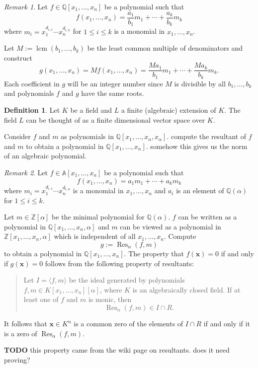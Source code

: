 \documentclass[
]{book}
\theoremstyle{definition}
\newtheorem{definition}{Definition}[chapter]
\theoremstyle{definition}
\theoremstyle{definition}
\theoremstyle{definition}
\theoremstyle{remark}
\newtheorem*{remark}{Remark}
\begin{document}
\begin{remark}
Let \(f \in \mathbb{Q}[x_1,\ldots,x_n]\) be a polynomial such that
\[
f(x_1,\ldots,x_n) = \dfrac{a_1}{b_1} m_1 + \cdots + \dfrac{a_k}{b_k} m_k
\]
where \(m_i = x_1^{d_{i,1}} \cdots x_n^{d_{i,n}}\) for \(1 \le i \le k\) is a monomial in \(x_1,\ldots,x_n\).

Let \(M := \operatorname{lcm}(b_1, \ldots, b_k)\) be the least common multiple of denominators and construct
\[
g(x_1,\ldots,x_n) = M f(x_1,\ldots,x_n) = \dfrac{M a_1}{b_1} m_1 + \cdots + \dfrac{M a_k}{b_k} m_k.
\]
Each coefficient in \(g\) will be an integer number since \(M\) is divisible by all \(b_1,\ldots,b_k\) and polynomials \(f\) and \(g\) have the same roots.
\end{remark}

\begin{definition}
\protect\hypertarget{def:norm}{}\label{def:norm}Let \(K\) be a field and \(L\) a finite (algebraic) extension of \(K\).
The field \(L\) can be thought of as a finite dimensional vector space over \(K\).

Consider \(f\) and \(m\) as polynomials in \(\mathbb{Q}[x_1,\ldots,x_n,x_\alpha]\). compute the resultant of \(f\) and \(m\) to obtain a polynomial in \(\mathbb{Q}[x_1,\ldots,x_n]\). somehow this gives us the norm of an algebraic polynomial.
\end{definition}

\begin{remark}
Let \(f \in \mathbb{A}[x_1,\ldots,x_n]\) be a polynomial such that
\[
f(x_1,\ldots,x_n) = a_1 m_1 + \cdots + a_k m_k
\]
where \(m_i = x_1^{d_{i,1}} \cdots x_n^{d_{i,n}}\) is a monomial in \(x_1,\ldots,x_n\) and \(a_i\) is an element of \(\mathbb{Q}(\alpha)\) for \(1 \le i \le k\).

Let \(m \in \mathbb{Z}[\alpha]\) be the minimal polynomial for \(\mathbb{Q}(\alpha)\). \(f\) can be written as a polynomial in \(\mathbb{Q}[x_1,\ldots,x_n,\alpha]\) and \(m\) can be viewed as a polynomial in \(\mathbb{Z}[x_1,\ldots,x_n,\alpha]\) which is independent of all \(x_1,\ldots,x_n\). Compute
\[
g := \operatorname{Res}_\alpha (f,m)
\]
to obtain a polynomial in \(\mathbb{Q}[x_1,\ldots,x_n]\). The property that \(f(\mathbf{x}) = 0\) if and only if \(g(\mathbf{x}) = 0\) follows from the following property of resultants:

\begin{quote}
Let \(I = \langle f, m \rangle\) be the ideal generated by polynomials \(f, m \in K[x_1,\ldots,x_n][\alpha]\), where \(K\) is an algebraically closed field. If at least one of \(f\) and \(m\) is monic, then
\[
\operatorname{Res}_\alpha (f,m) \in I \cap R.
\]
\end{quote}

It follows that \(\mathbf{x} \in K^n\) is a common zero of the elements of \(I \cap R\) if and only if it is a zero of \(\operatorname{Res}_\alpha(f,m)\).

\textbf{TODO} this property came from the wiki page on resultants. does it need proving?
\end{remark}
\end{document}
